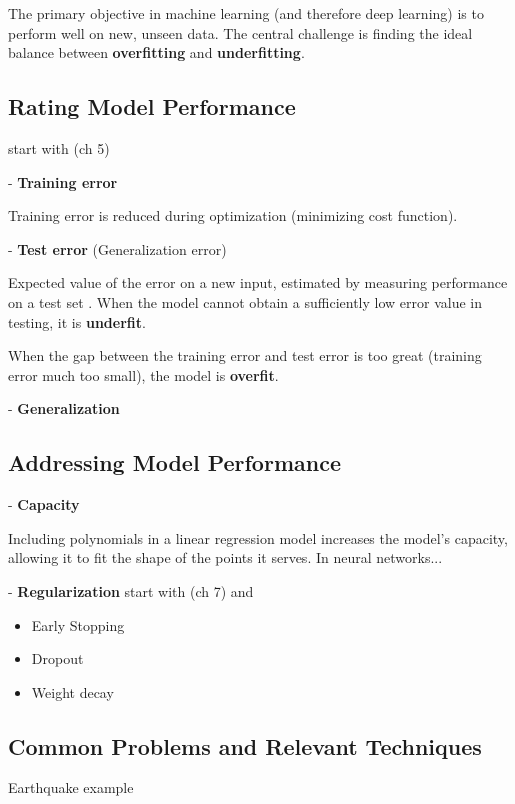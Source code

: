 The primary objective in machine learning (and therefore deep learning) is to perform well on new, unseen data.  The central challenge is finding the ideal balance between \textbf{overfitting} and \textbf{underfitting}.

\subsection{Rating Model Performance} start with \cite{Goodfellow-et-al-2016} (ch 5)

- \textbf{Training error}  

Training error is reduced during optimization (minimizing cost function).

- \textbf{Test error} (Generalization error)

Expected value of the error on a new input, estimated by measuring performance on a test set \cite{Goodfellow-et-al-2016}.  When the model cannot obtain a sufficiently low error value in testing, it is \textbf{underfit}.

When the gap between the training error and test error is too great (training error much too small), the model is \textbf{overfit}.

- \textbf{Generalization}




\subsection{Addressing Model Performance}

- \textbf{Capacity} 

Including polynomials in a linear regression model increases the model's capacity, allowing it to fit the shape of the points it serves.  In neural networks...

- \textbf{Regularization} start with \cite{Goodfellow-et-al-2016} (ch 7) and \cite{nusrat2018comparison}

\begin{itemize}
    \item
Early Stopping
    \item
Dropout
    \item
Weight decay
\end{itemize}

\subsection{Common Problems and Relevant Techniques}

Earthquake example